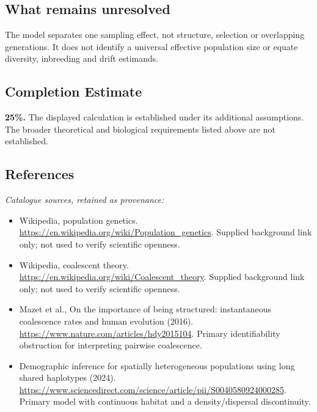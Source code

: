\documentclass[11pt]{article}
\begin{document}
\subsection{What remains unresolved}
The model separates one sampling effect, not structure, selection or overlapping generations. It does not identify a universal effective population size or equate diversity, inbreeding and drift estimands.
\subsection{Completion Estimate}
\textbf{25\%.} The displayed calculation is established under its additional assumptions. The broader theoretical and biological requirements listed above are not established.
\subsection{References}
\noindent\emph{Catalogue sources, retained as provenance:}
\begin{itemize}
\item Wikipedia, population genetics. \url{https://en.wikipedia.org/wiki/Population_genetics}. Supplied background link only; not used to verify scientific openness.
\item Wikipedia, coalescent theory. \url{https://en.wikipedia.org/wiki/Coalescent_theory}. Supplied background link only; not used to verify scientific openness.
\item Mazet et al., On the importance of being structured: instantaneous coalescence rates and human evolution (2016). \url{https://www.nature.com/articles/hdy2015104}. Primary identifiability obstruction for interpreting pairwise coalescence.
\item Demographic inference for spatially heterogeneous populations using long shared haplotypes (2024). \url{https://www.sciencedirect.com/science/article/pii/S0040580924000285}. Primary model with continuous habitat and a density/dispersal discontinuity.
\end{itemize}
\clearpage


\appendix
\end{document}
